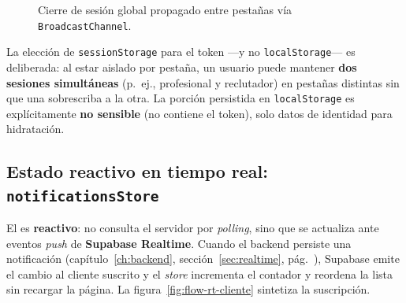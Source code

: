 \vspace{0.3cm}
\begin{figure}[h!]
\centering
{}
\caption{Cierre de sesión global propagado entre pestañas vía \texttt{BroadcastChannel}.}
\label{fig:flow-logout}
\end{figure}

\begin{NotaTecnica}
La elección de \texttt{sessionStorage} para el token —y no \texttt{localStorage}— es
deliberada: al estar aislado por pestaña, un usuario puede mantener \textbf{dos sesiones
simultáneas} (p.~ej., profesional y reclutador) en pestañas distintas sin que una
sobrescriba a la otra. La porción persistida en \texttt{localStorage} es explícitamente
\textbf{no sensible} (no contiene el token), solo datos de identidad para hidratación.
\end{NotaTecnica}

\subsection{Estado reactivo en tiempo real: \texttt{notificationsStore}}
\label{subsec:rt_cliente}

El  es \textbf{reactivo}: no consulta el servidor por
\textit{polling}, sino que se actualiza ante eventos \textit{push} de \textbf{Supabase
Realtime}. Cuando el backend persiste una notificación (capítulo~\ref{ch:backend},
sección~\ref{sec:realtime}, pág.~\pageref{sec:realtime}), Supabase emite el cambio al
cliente suscrito y el \textit{store} incrementa el contador y reordena la lista sin
recargar la página. La figura~\ref{fig:flow-rt-cliente} sintetiza la suscripción.


